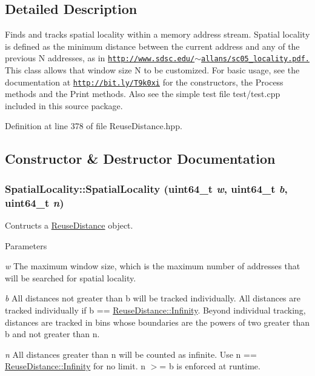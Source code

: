 \subsection{Detailed Description}
Finds and tracks spatial locality within a memory address stream. Spatial locality is defined as the minimum distance between the current address and any of the previous N addresses, as in \href{http://www.sdsc.edu/~allans/sc05_locality.pdf.}{\tt http://www.sdsc.edu/$\sim$allans/sc05\_\-locality.pdf.} This class allows that window size N to be customized. For basic usage, see the documentation at \href{http://bit.ly/T9k0xi}{\tt http://bit.ly/T9k0xi} for the constructors, the Process methods and the Print methods. Also see the simple test file test/test.cpp included in this source package. 

Definition at line 378 of file ReuseDistance.hpp.



\subsection{Constructor \& Destructor Documentation}
\hypertarget{class_spatial_locality_aff3106d38ff5ba3e6ecaec0c7214eaea}{
\subsubsection[{SpatialLocality}]{\setlength{\rightskip}{0pt plus 5cm}SpatialLocality::SpatialLocality (uint64\_\-t {\em w}, \/  uint64\_\-t {\em b}, \/  uint64\_\-t {\em n})}}
\label{class_spatial_locality_aff3106d38ff5ba3e6ecaec0c7214eaea}
Contructs a \hyperlink{class_reuse_distance}{ReuseDistance} object.


\begin{DoxyParams}{Parameters}
\item[{\em w}]The maximum window size, which is the maximum number of addresses that will be searched for spatial locality. \item[{\em b}]All distances not greater than b will be tracked individually. All distances are tracked individually if b == \hyperlink{class_reuse_distance_a59f7f0ac6ad014472537619394ac7375}{ReuseDistance::Infinity}. Beyond individual tracking, distances are tracked in bins whose boundaries are the powers of two greater than b and not greater than n. \item[{\em n}]All distances greater than n will be counted as infinite. Use n == \hyperlink{class_reuse_distance_a59f7f0ac6ad014472537619394ac7375}{ReuseDistance::Infinity} for no limit. n $>$= b is enforced at runtime. \end{DoxyParams}


